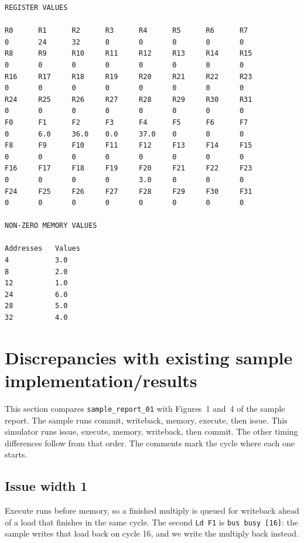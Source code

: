 \documentclass[11pt]{article}
\begin{document}
\begin{Verbatim}[fontsize=\scriptsize]
REGISTER VALUES

R0      R1      R2      R3      R4      R5      R6      R7      
0       24      32      0       0       0       0       0       
R8      R9      R10     R11     R12     R13     R14     R15     
0       0       0       0       0       0       0       0       
R16     R17     R18     R19     R20     R21     R22     R23     
0       0       0       0       0       0       0       0       
R24     R25     R26     R27     R28     R29     R30     R31     
0       0       0       0       0       0       0       0       
F0      F1      F2      F3      F4      F5      F6      F7      
0       6.0     36.0    0.0     37.0    0       0       0       
F8      F9      F10     F11     F12     F13     F14     F15     
0       0       0       0       0       0       0       0       
F16     F17     F18     F19     F20     F21     F22     F23     
0       0       0       0       3.0     0       0       0       
F24     F25     F26     F27     F28     F29     F30     F31     
0       0       0       0       0       0       0       0       

NON-ZERO MEMORY VALUES

Addresses   Values
4           3.0
8           2.0
12          1.0
24          6.0
28          5.0
32          4.0
\end{Verbatim}
\section{Discrepancies with existing sample implementation/results}

This section compares \texttt{sample\_report\_01} with Figures~1 and~4 of the sample report. The sample runs commit, writeback, memory, execute, then issue. This simulator runs issue, execute, memory, writeback, then commit. The other timing differences follow from that order. The comments mark the cycle where each one starts.

\subsection*{Issue width 1}

Execute runs before memory, so a finished multiply is queued for writeback ahead of a load that finishes in the same cycle. The second \texttt{Ld F1} is \texttt{bus busy [16]}: the sample writes that load back on cycle 16, and we write the multiply back instead.
\end{document}
